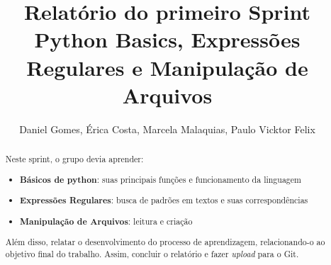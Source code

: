 \documentclass[12pt, a4paper, twocolumn]{article}
\title{Relatório do primeiro Sprint\\ \textbf{Python Basics, Expressões Regulares e Manipulação de Arquivos}
		}
\author{Daniel Gomes, Érica Costa, Marcela Malaquias, Paulo Vicktor Felix}
\begin{document}
\maketitle

\begin{abstract}
Neste sprint, o grupo devia aprender:
\begin{itemize}
	\item \textbf{Básicos de python}: suas principais funções e funcionamento da linguagem
	\item \textbf{Expressões Regulares}: busca de padrões em textos e suas correspondências
	\item \textbf{Manipulação de Arquivos}: leitura e criação
\end{itemize}

Além disso, relatar o desenvolvimento do processo de aprendizagem, relacionando-o ao objetivo final do trabalho. Assim, concluir o relatório e fazer \textit{upload} para o Git.

\end{abstract}
\end{document}
